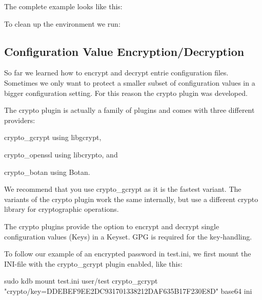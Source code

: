 The complete example looks like this\+:




To clean up the environment we run\+:




\subsection*{Configuration Value Encryption/\+Decryption}

So far we learned how to encrypt and decrypt entrie configuration files. Sometimes we only want to protect a smaller subset of configuration values in a bigger configuration setting. For this reason the {\ttfamily crypto} plugin was developed.

The {\ttfamily crypto} plugin is actually a family of plugins and comes with three different providers\+:


\begin{DoxyEnumerate}
\item {\ttfamily crypto\+\_\+gcrypt} using {\ttfamily libgcrypt},
\item {\ttfamily crypto\+\_\+openssl} using {\ttfamily libcrypto}, and
\item {\ttfamily crypto\+\_\+botan} using {\ttfamily Botan}.
\end{DoxyEnumerate}

We recommend that you use {\ttfamily crypto\+\_\+gcrypt} as it is the fastest variant. The variants of the {\ttfamily crypto} plugin work the same internally, but use a different crypto library for cryptographic operations.

The {\ttfamily crypto} plugins provide the option to encrypt and decrypt single configuration values (Keys) in a Keyset. G\+PG is required for the key-\/handling.

To follow our example of an encrypted password in {\ttfamily test.\+ini}, we first mount the I\+N\+I-\/file with the {\ttfamily crypto\+\_\+gcrypt} plugin enabled, like this\+: \begin{DoxyVerb}    sudo kdb mount test.ini user/test crypto_gcrypt "crypto/key=DDEBEF9EE2DC931701338212DAF635B17F230E8D" base64 ini
\end{DoxyVerb}


